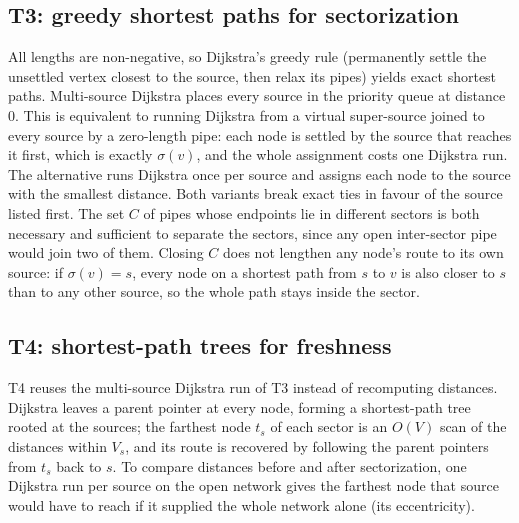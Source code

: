 \subsection{T3: greedy shortest paths for sectorization}
All lengths are non-negative, so Dijkstra's greedy rule (permanently settle the unsettled vertex closest to the source, then relax its pipes) yields exact shortest paths. Multi-source Dijkstra places every source in the priority queue at distance 0. This is equivalent to running Dijkstra from a virtual super-source joined to every source by a zero-length pipe: each node is settled by the source that reaches it first, which is exactly $\sigma(v)$, and the whole assignment costs one Dijkstra run. The alternative runs Dijkstra once per source and assigns each node to the source with the smallest distance. Both variants break exact ties in favour of the source listed first. The set $C$ of pipes whose endpoints lie in different sectors is both necessary and sufficient to separate the sectors, since any open inter-sector pipe would join two of them. Closing $C$ does not lengthen any node's route to its own source: if $\sigma(v)=s$, every node on a shortest path from $s$ to $v$ is also closer to $s$ than to any other source, so the whole path stays inside the sector.

\subsection{T4: shortest-path trees for freshness}
T4 reuses the multi-source Dijkstra run of T3 instead of recomputing distances. Dijkstra leaves a parent pointer at every node, forming a shortest-path tree rooted at the sources; the farthest node $t_s$ of each sector is an $O(V)$ scan of the distances within $V_s$, and its route is recovered by following the parent pointers from $t_s$ back to $s$. To compare distances before and after sectorization, one Dijkstra run per source on the open network gives the farthest node that source would have to reach if it supplied the whole network alone (its eccentricity).

